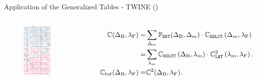 \begin{frame}{Application of the Generalized \dlct Tables - TWINE ({\scriptsize\protect\dlfeistellegend})}
\vspace{-0.8cm}
\begin{columns}
\begin{figure}
  \includegraphics[width=0.60\textwidth, clip]{./figures/twine_double_dlct_example_1.pdf}
\end{figure}
{
\scriptsize
\begin{align*}
  \mathbb{C}(\Delta_{\textrm{B}}, \lambda_{\textrm{F}}) =& \sum_{\Delta_{m}} \mathbb{P}_{\texttt{DDT}}(\Delta_{\textrm{B}}, \Delta_{m}) \cdot \mathbb{C}_{\texttt{DDLCT}}\left(\Delta_{m}, \lambda_{\textrm{F}}\right)\\
                                            =& \sum_{\lambda_{m}} \mathbb{C}_{\texttt{DDLCT}}\left(\Delta_{\textrm{B}}, \lambda_{m}\right) \cdot \mathbb{C}^{2}_{\texttt{LAT}}\left(\lambda_{m}, \lambda_{\textrm{F}}\right).\\
  \mathbb{C}_{tot}(\Delta_{\textrm{B}}, \lambda_{\textrm{F}})       =& \mathbb{C}^{2}(\Delta_{\textrm{B}}, \lambda_{\textrm{F}}).
\end{align*}}
\smallskip
{}
\end{columns}
\end{frame}
